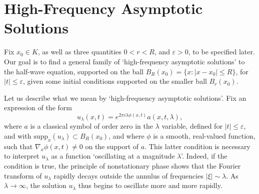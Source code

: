 \documentclass{article}
\theoremstyle{plain}
\theoremstyle{remark}
\theoremstyle{definition}
\DeclareMathOperator{\RR}{\mathbb{R}}
\begin{document}

\section{High-Frequency Asymptotic Solutions}

Fix $x_0 \in K$, as well as three quantities $0 < r < R$, and $\varepsilon > 0$, to be specified later. Our goal is to find a general family of `high-frequency asymptotic solutions' to the half-wave equation, supported on the ball $B_R(x_0) = \{ x: |x - x_0| \leq R \}$, for $|t| \leq \varepsilon$, given some initial conditions supported on the smaller ball $B_r(x_0)$.


Let us describe what we mean by `high-frequency asymptotic solutions'. Fix an expression of the form
%
\[ u_\lambda(x,t) = e^{2 \pi i \lambda \phi(x,t)} a(x,t,\lambda), \]
%
where $a$ is a classical symbol of order zero in the $\lambda$ variable, defined for $|t| \leq \varepsilon$, and with $\text{supp}_x(u_\lambda) \subset B_R(x_0)$, and where $\phi$ is a smooth, real-valued function, such that $\nabla_x \phi(x,t) \neq 0$ on the support of $a$. This latter condition is necessary to interpret $u_\lambda$ as a function `oscillating at a magnitude $\lambda$'. Indeed, if the condition is true, the principle of nonstationary phase shows that the Fourier transform of $u_\lambda$ rapidly decays outside the annulus of frequencies $|\xi| \sim \lambda$. As $\lambda \to \infty$, the solution $u_\lambda$ thus begins to oscillate more and more rapidly.

%
\end{document}
